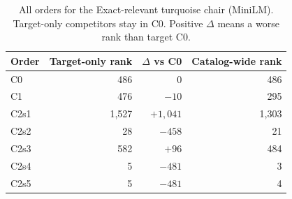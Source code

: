\begin{table}[htbp]
\caption{All orders for the Exact-relevant turquoise chair (MiniLM). Target-only competitors stay in C0. Positive $\Delta$ means a worse rank than target C0.}
\label{tab:caseorders}\centering\small
\begin{tabular}{lrrr}\toprule
Order & Target-only rank & $\Delta$ vs C0 & Catalog-wide rank\\\midrule
C0 & 486 & 0 & 486\\
C1 & 476 & $-10$ & 295\\
C2s1 & 1,527 & $+1,041$ & 1,303\\
C2s2 & 28 & $-458$ & 21\\
C2s3 & 582 & $+96$ & 484\\
C2s4 & 5 & $-481$ & 3\\
C2s5 & 5 & $-481$ & 4\\\bottomrule
\end{tabular}
\end{table}
